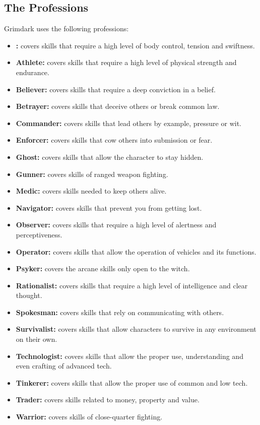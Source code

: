 \subsection{The Professions}
Grimdark uses the following professions:
\begin{itemize}
	\item \textbf{:} covers skills that require a high level of body control, tension and swiftness.
	\item \textbf{Athlete:} covers skills that require a high level of physical strength and endurance.
	\item \textbf{Believer:} covers skills that require a deep conviction in a belief.
	\item \textbf{Betrayer:} covers skills that deceive others or break common law.
	\item \textbf{Commander:} covers skills that lead others by example, pressure or wit.
	\item \textbf{Enforcer:} covers skills that cow others into submission or fear.
	\item \textbf{Ghost:} covers skills that allow the character to stay hidden.
	\item \textbf{Gunner:} covers skills of ranged weapon fighting.
	\item \textbf{Medic:} covers skills needed to keep others alive.
	\item \textbf{Navigator:} covers skills that prevent you from getting lost.
	\item \textbf{Observer:} covers skills that require a high level of alertness and perceptiveness.
	\item \textbf{Operator:} covers skills that allow the operation of vehicles and its functions.
	\item \textbf{Psyker:} covers the arcane skills only open to the witch.
	\item \textbf{Rationalist:} covers skills that require a high level of intelligence and clear thought.
	\item \textbf{Spokesman:} covers skills that rely on communicating with others.
	\item \textbf{Survivalist:} covers skills that allow characters to survive in any environment on their own.
	\item \textbf{Technologist:} covers skills that allow the proper use, understanding and even crafting of advanced tech.
	\item \textbf{Tinkerer:} covers skills that allow the proper use of common and low tech.
	\item \textbf{Trader:} covers skills related to money, property and value.
	\item \textbf{Warrior:} covers skills of close-quarter fighting.
\end{itemize}

